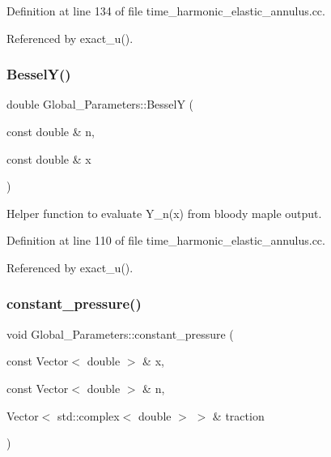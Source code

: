 Definition at line 134 of file time\+\_\+harmonic\+\_\+elastic\+\_\+annulus.\+cc.



Referenced by exact\+\_\+u().

\mbox{\label{namespaceGlobal__Parameters_a51c78ffbd213fe1293eef5d048abcc5a}} 
\subsubsection{\texorpdfstring{Bessel\+Y()}{BesselY()}}
{\footnotesize\ttfamily double Global\+\_\+\+Parameters\+::\+BesselY (\begin{DoxyParamCaption}\item[{const double \&}]{n,  }\item[{const double \&}]{x }\end{DoxyParamCaption})}



Helper function to evaluate Y\+\_\+n(x) from bloody maple output. 



Definition at line 110 of file time\+\_\+harmonic\+\_\+elastic\+\_\+annulus.\+cc.



Referenced by exact\+\_\+u().

\mbox{\label{namespaceGlobal__Parameters_a8363ab9f8687e9f7802f801f6dcab6e6}} 
\subsubsection{\texorpdfstring{constant\+\_\+pressure()}{constant\_pressure()}}
{\footnotesize\ttfamily void Global\+\_\+\+Parameters\+::constant\+\_\+pressure (\begin{DoxyParamCaption}\item[{const Vector$<$ double $>$ \&}]{x,  }\item[{const Vector$<$ double $>$ \&}]{n,  }\item[{Vector$<$ std\+::complex$<$ double $>$ $>$ \&}]{traction }\end{DoxyParamCaption})}



